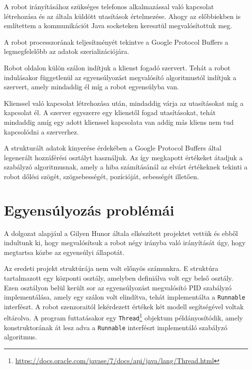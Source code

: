 A robot irányításához szükséges telefonos alkalmazással való kapcsolat létrehozása és az általa küldött utasítások értelmezése. Ahogy az előbbiekben is említettem a kommunikációt Java socketeken keresztül megvalósítottuk meg.

A robot processzorának teljesítményét tekintve a Google Protocol Buffers a legmegfelelőbb az adatok szerializációjára.

Robot oldalon külön szálon indítjuk a klienst fogadó szervert. Tehát a robot indulásakor függetlenül az egyensúlyozást megvalósító algoritmustól indítjuk a szervert, amely mindaddig él míg a robot egyensúlyba van.

Klienssel való kapcsolat létrehozása után, mindaddig várja az utasításokat míg a kapcsolat él. A szerver egyszerre egy klienstől fogad utasításokat, tehát mindaddig amíg egy adott klienssel kapcsolata van addig más kliens nem tud kapcsolódni a szerverhez.

A strukturált adatok kinyerése érdekében a Google Protocol Buffers által legenerált hozzáférési osztályt használjuk. Az így megkapott értékeket átadjuk a szabályzó algoritmusnak, amely a hiba számításánál az elvárt értékeknek tekinti a robot dőlési szögét, szögsebességét, pozícióját, sebességét illetően.


\section{Egyensúlyozás problémái}\label{sec:MEGVALOSITAS:pidModositas}

A dolgozat alapjául a Gilyen Hunor általa elkészített projektet vettük és ebből indultunk ki, hogy megvalósítsuk a robot négy irányba való irányítását úgy, hogy megtartsa közbe az egyensúlyi állapotát.

Az eredeti projekt struktúrája nem volt előnyös számunkra. E struktúra tartalmazott egy központi osztály, amelyben definiálva volt egy belső osztály. Ezen osztályon belül került sor az egyensúlyozást megvalósító PID szabályzó implementálása, amely egy szálon volt elindítva, tehát implementálta a \texttt{Runnable} interfészt. A robot szenzoraitól lekérdezett értékek két modell segítségével voltak eltárolva. A program futtatásakor egy \texttt{Thread}\footnote{\href{https://docs.oracle.com/javase/7/docs/api/java/lang/Thread.html}{https://docs.oracle.com/javase/7/docs/api/java/lang/Thread.html}} objektum példányosítódik, amely konstruktorának át lesz adva a \texttt{Runnable} interfészt implementáló szabályzó algoritmus.

